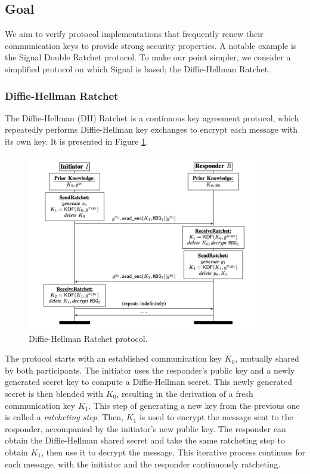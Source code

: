 \subsection{Goal}
\label{sec:goal}

We aim to verify protocol implementations that frequently renew their communication keys to provide strong security properties.
A notable example is the Signal Double Ratchet protocol. To make our point simpler, we consider a simplified protocol on which Signal is based; the Diffie-Hellman Ratchet.

\subsubsection{Diffie-Hellman Ratchet}
\label{sec:diffie-hellman-ratchet}

The Diffie-Hellman (DH) Ratchet is a continuous key agreement protocol, which repeatedly performs Diffie-Hellman key exchanges to encrypt each message with its own key.
It is presented in Figure \ref{fig:dh-ratchet}.

\begin{figure}
    \centering
    \includegraphics[width=0.9\textwidth]{figures/DH-ratchet.png}
    \caption{Diffie-Hellman Ratchet protocol.}
    \label{fig:dh-ratchet}
\end{figure}

The protocol starts with an established communication key $K_0$, mutually shared by both participants.
The initiator uses the responder's public key and a newly generated secret key to compute a Diffie-Hellman secret. 
This newly generated secret is then blended with $K_0$, resulting in the derivation of a fresh communication key $K_1$.
This step of generating a new key from the previous one is called a \emph{ratcheting step}.
Then, $K_1$ is used to encrypt the message sent to the responder, accompanied by the initiator's new public key.
The responder can obtain the Diffie-Hellman shared secret and take the same ratcheting step to obtain $K_1$, then use it to decrypt the message.
This iterative process continues for each message, with the initiator and the responder continuously ratcheting.

